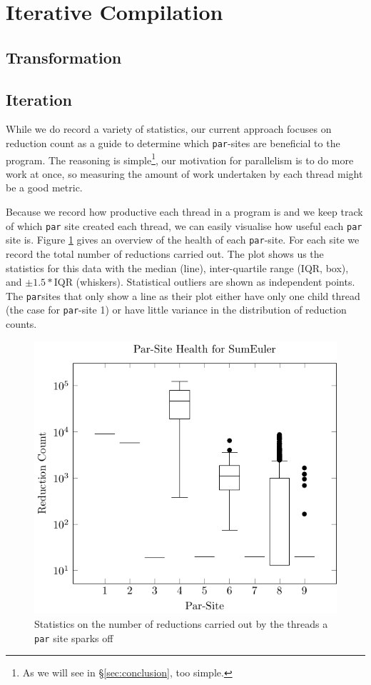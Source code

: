 %
%
\section{Iterative Compilation}
\label{sec:iterate}


\subsection*{Transformation}

\subsection*{Iteration}

While we do record a variety of statistics, our current approach focuses on reduction
count as a guide to determine which \verb-par--sites are beneficial to the program.
The reasoning is simple\footnote{As we will see in \S \ref{sec:conclusion}, too simple.},
our motivation for parallelism is to do more work at once, so measuring the amount
of work undertaken by each thread might be a good metric.

Because we record how productive each thread in a program is and we keep track
of which \verb-par- site created each thread, we can easily visualise how useful
each \verb-par- site is. Figure \ref{fig:sumHist} gives an overview of the health
of each \verb-par--site. For each site we record the total number of reductions
carried out. The plot shows us the statistics for this data with the median
(line), inter-quartile range (IQR, box), and $\pm1.5 * $IQR (whiskers).
Statistical outliers are shown as independent points. The \verb-par-sites that
only show a line as their plot either have only one child thread (the case for
\verb-par--site 1) or have little variance in the distribution of reduction
counts.

\begin{figure}
  \includegraphics[width=\linewidth]{Informed/Figures/threadhealth.pdf}
\caption{Statistics on the number of reductions carried out by the threads a
\texttt{par} site sparks off}
\label{fig:sumHist}
\end{figure}

